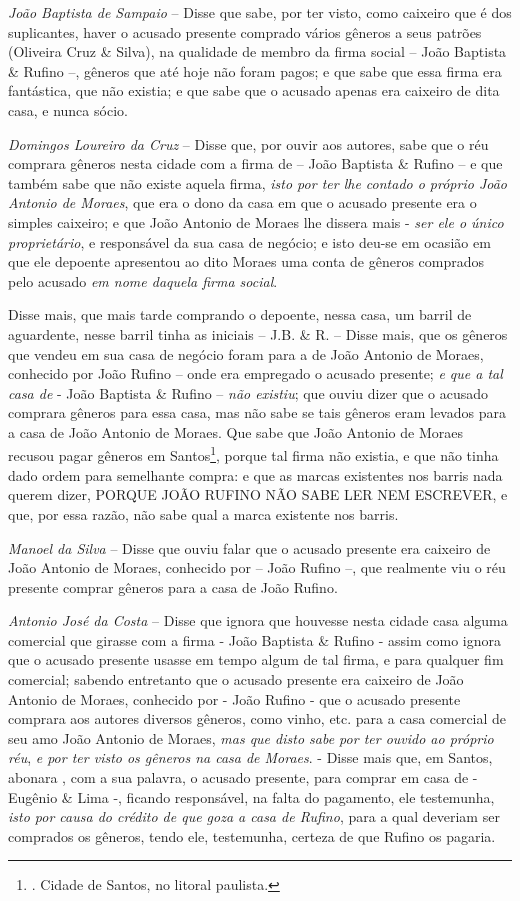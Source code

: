 \emph{João Baptista de Sampaio} -- Disse que sabe, por ter visto, como
caixeiro que é dos suplicantes, haver o acusado presente comprado vários
gêneros a seus patrões (Oliveira Cruz \& Silva), na qualidade de membro
da firma social -- João Baptista \& Rufino --, gêneros que até hoje não
foram pagos; e que sabe que essa firma era fantástica, que não existia;
e que sabe que o acusado apenas era caixeiro de dita casa, e nunca
sócio.

\emph{Domingos Loureiro da Cruz} -- Disse que, por ouvir aos autores,
sabe que o réu comprara gêneros nesta cidade com a firma de -- João
Baptista \& Rufino -- e que também sabe que não existe aquela firma,
\emph{isto por ter lhe contado o próprio João Antonio de Moraes}, que
era o dono da casa em que o acusado presente era o simples caixeiro; e
que João Antonio de Moraes lhe dissera mais - \emph{ser ele o único
proprietário}, e responsável da sua casa de negócio; e isto deu-se em
ocasião em que ele depoente apresentou ao dito Moraes uma conta de
gêneros comprados pelo acusado \emph{em nome daquela firma social}.

Disse mais, que mais tarde comprando o depoente, nessa casa, um barril
de aguardente, nesse barril tinha as iniciais -- J.B. \& R. -- Disse
mais, que os gêneros que vendeu em sua casa de negócio foram para a de
João Antonio de Moraes, conhecido por João Rufino -- onde era empregado
o acusado presente; \emph{e que a tal casa de} - João Baptista \& Rufino
-- \emph{não existiu}; que ouviu dizer que o acusado comprara gêneros
para essa casa, mas não sabe se tais gêneros eram levados para a casa de
João Antonio de Moraes. Que sabe que João Antonio de Moraes recusou
pagar gêneros em Santos\footnote{. Cidade de Santos, no litoral
  paulista.}, porque tal firma não existia, e que não tinha dado ordem
para semelhante compra: e que as marcas existentes nos barris nada
querem dizer, PORQUE JOÃO RUFINO NÃO SABE LER NEM ESCREVER, e que, por
essa razão, não sabe qual a marca existente nos barris.

\emph{Manoel da Silva} -- Disse que ouviu falar que o acusado presente
era caixeiro de João Antonio de Moraes, conhecido por -- João Rufino --,
que realmente viu o réu presente comprar gêneros para a casa de João
Rufino.

\emph{Antonio José da Costa} -- Disse que ignora que houvesse nesta
cidade casa alguma comercial que girasse com a firma - João Baptista \&
Rufino - assim como ignora que o acusado presente usasse em tempo algum
de tal firma, e para qualquer fim comercial; sabendo entretanto que o
acusado presente era caixeiro de João Antonio de Moraes, conhecido por -
João Rufino - que o acusado presente comprara aos autores diversos
gêneros, como vinho, etc. para a casa comercial de seu amo João Antonio
de Moraes, \emph{mas que disto sabe por ter ouvido ao próprio réu},
\emph{e por ter visto os gêneros na casa de Moraes}. - Disse mais que,
em Santos, abonara , com a sua palavra, o acusado presente, para comprar
em casa de - Eugênio \& Lima -, ficando responsável, na falta do
pagamento, ele testemunha, \emph{isto por causa do crédito de que goza a
casa de Rufino}, para a qual deveriam ser comprados os gêneros, tendo
ele, testemunha, certeza de que Rufino os pagaria.

